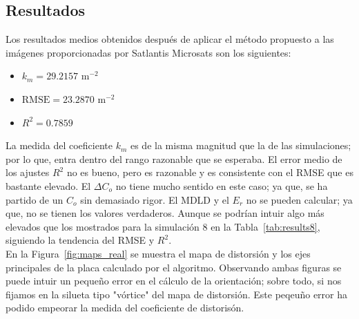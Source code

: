 \documentclass[12pt]{article}
\numberwithin{equation}{section}%
\begin{document}
\subsection{Resultados}

Los resultados medios obtenidos después de aplicar el método propuesto a las imágenes proporcionadas por Satlantis Microsats son los siguientes:
\begin{itemize}
    \item \(k_m=29.2157\text{ m}^{-2}\) 
    \item \(\text{RMSE}=23.2870\text{ m}^{-2}\)
    \item \(R^2=0.7859\)
\end{itemize}

La medida del coeficiente \(k_m\) es de la misma magnitud que la de las simulaciones; por lo que, entra dentro del rango razonable que se esperaba. El error medio de los ajustes \(R^2\) no es bueno, pero es razonable y es consistente con el RMSE que es bastante elevado. El \(\Delta C_o\) no tiene mucho sentido en este caso; ya que, se ha partido de un \(C_o\) sin demasiado rigor. El MDLD y el \(E_r\) no se pueden calcular; ya que, no se tienen los valores verdaderos. Aunque se podrían intuir algo más elevados que los mostrados para la simulación 8 en la Tabla\ \ref{tab:results8}, siguiendo la tendencia del RMSE y \(R^2\).\\

En la Figura\ \ref{fig:maps_real} se muestra el mapa de distorsión y los ejes principales de la placa calculado por el algoritmo. Observando ambas figuras se puede intuir un pequeño error en el cálculo de la orientación; sobre todo, si nos fijamos en la silueta tipo "vórtice" del mapa de distorsión. Este peqeuño error ha podido empeorar la medida del coeficiente de distorisón.\\
\end{document}
